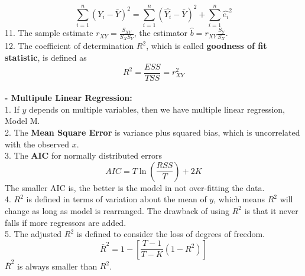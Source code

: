 \documentclass{article}
\begin{document}
\begin{enumerate}[S1 - ]
    \begin{equation*}
    \sum_{i=1}^{n}(Y_i-\bar{Y})^2 = \sum_{i=1}^{n}(\hat{Y_i}-\bar{Y})^2 + \sum_{i=1}^{n}\hat{e_i}^2
    \end{equation*}
    11. The sample estimate $r_{XY} = \frac{S_{XY}}{S_XS_Y}$, the estimator $\hat{b} = r_{XY}\frac{S_Y}{S_X}$.\\
    12. The coefficient of determination $R^2$, which is called \textbf{goodness of fit statistic}, is defined as
    \begin{equation*}
    R^2 = \frac{ESS}{TSS} = r_{XY}^2
    \end{equation*}
    \\
    \textbf{- Multipule Linear Regression:}\\
    1. If $y$ depends on multiple variables, then we have multiple linear regression, Model M.\\
    2. The \textbf{Mean Square Error} is variance plus squared bias, which is uncorrelated with the observed $x$.\\
    3. The \textbf{AIC} for normally distributed errors
    \begin{equation*}
    AIC = T\ln(\frac{RSS}{T}) + 2K
    \end{equation*}
    The smaller AIC is, the better is the model in not over-fitting the data.\\
    4. $R^2$ is defined in terms of variation about the mean of $y$, which means $R^2$ will change as long as model is rearranged. The drawback of using $R^2$ is that it never falls if more regressors are added.\\
    5. The adjusted $R^2$ is defined to consider the loss of degrees of freedom.
    \begin{equation*}
    \bar{R}^2 = 1-\left[\frac{T-1}{T-K}(1-R^2)\right]
    \end{equation*}
    $\bar{R}^2$ is always smaller than $R^2$.\\
    

\end{enumerate}
\end{document}
